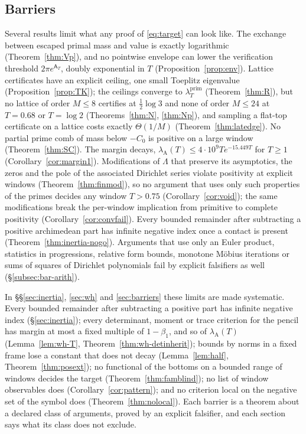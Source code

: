 \documentclass[11pt]{amsart}
\theoremstyle{definition}
\theoremstyle{remark}
\newcommand{\lamP}{\lambda^{\mathrm{prim}}_T}
\newcommand{\lamA}{\lambda_{\mathrm A}(T)}
\newcommand{\Aconst}{\mathsf A_T}
\begin{document}
\subsection{Barriers}
Several results limit what any proof of \eqref{eq:target} can look like. The exchange between escaped
primal mass and value is exactly logarithmic (Theorem~\ref{thm:Vp}), and no pointwise envelope can lower
the verification threshold $2\pi e^{\Aconst}$, doubly exponential in $T$ (Proposition~\ref{prop:env}).
Lattice certificates have an explicit ceiling, one small Toeplitz eigenvalue (Proposition~\ref{prop:TK});
the ceilings converge to $\lamP$ (Theorem~\ref{thm:R}), but no lattice of order $M\le8$ certifies at
$\frac12\log3$ and none of order $M\le24$ at $T=0.68$ or $T=\log2$ (Theorems~\ref{thm:N}, \ref{thm:Np}),
and sampling a flat-top certificate on a lattice costs exactly $\Theta(1/M)$
(Theorem~\ref{thm:latedge}). No partial prime comb of mass below $-C_0$ is positive on a large window
(Theorem~\ref{thm:SC}). The margin decays, $\lamA\le4\cdot10^9Te^{-15.449T}$ for $T\ge1$
(Corollary~\ref{cor:margin1}). Modifications of $\Lambda$ that preserve its asymptotics, the zeros and the
pole of the associated Dirichlet series violate positivity at explicit windows (Theorem~\ref{thm:finmod}), so
no argument that uses only such properties of the primes decides any window $T>0.75$
(Corollary~\ref{cor:void}); the same modifications break the per-window implication from primitive to
complete positivity (Corollary~\ref{cor:convfail}). Every bounded remainder after subtracting a positive
archimedean part has infinite negative index once a contact is present (Theorem~\ref{thm:inertia-nogo}).
Arguments that use only an Euler product, statistics in progressions, relative form bounds, monotone M\"obius iterations or
sums of squares of Dirichlet polynomials fail by explicit falsifiers as well (\S\ref{subsec:bar-arith}).

In \S\S\ref{sec:inertia}, \ref{sec:wh} and \ref{sec:barriers} these limits are made systematic. Every
bounded remainder after subtracting a positive part has infinite negative index (\S\ref{sec:inertia}); every
determinant, moment or trace criterion for the pencil has margin at most a fixed multiple of $1-\beta_1$, and
so of $\lamA$ (Lemma~\ref{lem:wh-T}, Theorem~\ref{thm:wh-detinherit}); bounds by norms in a fixed frame lose a
constant that does not decay (Lemma~\ref{lem:half}, Theorem~\ref{thm:posext}); no functional of the bottoms on a
bounded range of windows decides the target (Theorem~\ref{thm:famblind}); no list of window observables does
(Corollary~\ref{cor:pattern}); and no criterion local on the negative set of the symbol does
(Theorem~\ref{thm:nolocal}). Each barrier is a theorem about a declared class of arguments, proved by an explicit
falsifier, and each section says what its class does not exclude.
\end{document}
